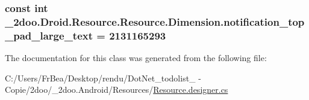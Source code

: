 \hypertarget{class__2doo_1_1_droid_1_1_resource_1_1_dimension_59bff3aeb31bff508874328d7c65277c}{
\subsubsection[{notification\_\-top\_\-pad\_\-large\_\-text}]{\setlength{\rightskip}{0pt plus 5cm}const int \_\-2doo.Droid.Resource.Resource.Dimension.notification\_\-top\_\-pad\_\-large\_\-text = 2131165293}}
\label{class__2doo_1_1_droid_1_1_resource_1_1_dimension_59bff3aeb31bff508874328d7c65277c}




The documentation for this class was generated from the following file:\begin{CompactItemize}
\item 
C:/Users/FrBea/Desktop/rendu/DotNet\_\-todolist\_ - Copie/2doo/\_\-2doo.Android/Resources/\hyperlink{_resource_8designer_8cs}{Resource.designer.cs}\end{CompactItemize}
